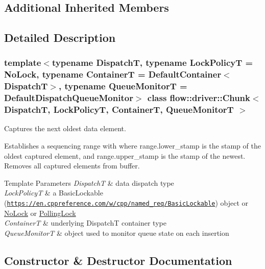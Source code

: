 \subsection*{Additional Inherited Members}


\subsection{Detailed Description}
\subsubsection*{template$<$typename DispatchT, typename Lock\+PolicyT = No\+Lock, typename ContainerT = Default\+Container$<$\+Dispatch\+T$>$, typename Queue\+MonitorT = Default\+Dispatch\+Queue\+Monitor$>$\newline
class flow\+::driver\+::\+Chunk$<$ Dispatch\+T, Lock\+Policy\+T, Container\+T, Queue\+Monitor\+T $>$}

Captures the next oldest data element. 

Establishes a sequencing range with where {\ttfamily range.\+lower\+\_\+stamp} is the stamp of the oldest captured element, and {\ttfamily range.\+upper\+\_\+stamp} is the stamp of the newest. Removes all captured elements from buffer.


\begin{DoxyTemplParams}{Template Parameters}
{\em DispatchT} & data dispatch type \\
\hline
{\em Lock\+PolicyT} & a Basic\+Lockable (\href{https://en.cppreference.com/w/cpp/named_req/BasicLockable}{\tt https\+://en.\+cppreference.\+com/w/cpp/named\+\_\+req/\+Basic\+Lockable}) object or \hyperlink{structflow_1_1_no_lock}{No\+Lock} or \hyperlink{structflow_1_1_polling_lock}{Polling\+Lock} \\
\hline
{\em ContainerT} & underlying {\ttfamily DispatchT} container type \\
\hline
{\em Queue\+MonitorT} & object used to monitor queue state on each insertion \\
\hline
\end{DoxyTemplParams}


\subsection{Constructor \& Destructor Documentation}
\mbox{\label{classflow_1_1driver_1_1_chunk_a19ef6ce723c1b2922b931471b835b627}} 
